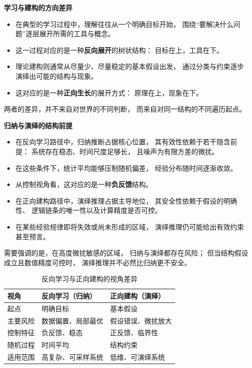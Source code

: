 \documentclass[openany, a4paper, 12pt]{book}
\begin{document}
\begin{readingnote}
	\textbf{学习与建构的方向差异}
	
	\begin{itemize}
		\item 在典型的学习过程中，理解往往从一个明确目标开始，
		围绕“要解决什么问题”逐层展开所需的工具与概念。
		\item 这一过程对应的是一种\textbf{反向展开}的树状结构：
		目标在上，工具在下。
		\item 理论建构则通常从尽量少、尽量稳定的基本假设出发，
		通过分类与约束逐步演绎出可能的结构与现象。
		\item 这对应的是一种\textbf{正向生长}的展开方式：
		原理在上，现象在下。
	\end{itemize}
	
	两者的差异，并不来自对世界的不同判断，
	而来自对同一结构的不同遍历起点。
	
	\vspace{0.5em}
	\textbf{归纳与演绎的结构前提}
	
	\begin{itemize}
		\item 在反向学习路径中，归纳推断占据核心位置，
		其有效性依赖于若干隐含前提：
		系统存在稳态、时间尺度足够长，
		且噪声为有限方差的微扰。
		\item 在这些条件下，统计平均能够压制随机偏差，
		经验分布随时间逐渐收敛。
		\item 从控制视角看，这对应的是一种\textbf{负反馈}结构。
		\item 在正向建构路径中，演绎推理占据主导地位，
		其安全性依赖于假设的明确性、
		逻辑链条的唯一性以及计算精度是否可控。
		\item 在某些经验规律即将失效或尚未形成的区域，
		演绎推理仍可能给出有效约束甚至预言。
	\end{itemize}
	
	需要强调的是，在高度微扰敏感的区域，
	归纳与演绎都存在风险；
	但当结构假设成立且数值精度可控时，
	演绎推理并不必然比归纳更不安全。
\end{readingnote}



\begin{table}[h]
	\centering
	\caption{反向学习与正向建构的视角差异}
	\begin{tabular}{lll}
		\toprule
		视角 & 反向学习（归纳） & 正向建构（演绎） \\
		\midrule
		起点 & 明确目标 & 基本假设 \\
		主要风险 & 数据偏置、局部最优 & 假设错误、微扰放大 \\
		控制特征 & 负反馈、稳态 & 正反馈、临界性 \\
		随机过程 & 时间平均 & 结构约束 \\
		适用范围 & 高复杂、可采样系统 & 低维、可演绎系统 \\
		\bottomrule
	\end{tabular}
\end{table}
\end{document}

